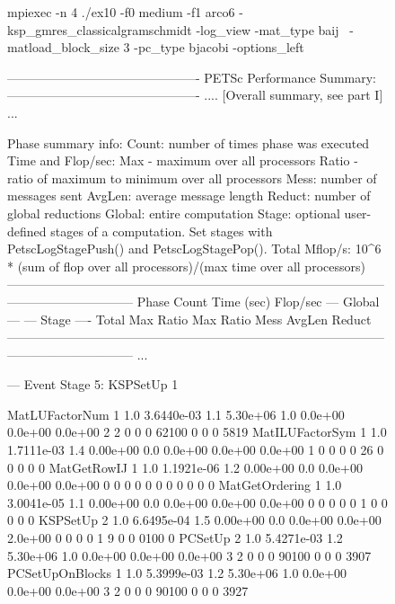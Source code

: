 \begin{figure}[tb]
  \begin{outputlisting}[\tiny\ttfamily]
mpiexec -n 4 ./ex10 -f0 medium -f1 arco6 -ksp_gmres_classicalgramschmidt -log_view -mat_type baij \
            -matload_block_size 3 -pc_type bjacobi -options_left

---------------------------------------------- PETSc Performance Summary: ----------------------------------------------
.... [Overall summary, see part I] ...

Phase summary info:
   Count: number of times phase was executed
   Time and Flop/sec: Max - maximum over all processors
                       Ratio - ratio of maximum to minimum over all processors
   Mess: number of messages sent
   AvgLen: average message length
   Reduct: number of global reductions
   Global: entire computation
   Stage: optional user-defined stages of a computation. Set stages with PetscLogStagePush() and PetscLogStagePop().
   Total Mflop/s: 10^6 * (sum of flop over all processors)/(max time over all processors)
------------------------------------------------------------------------------------------------------------------------
Phase              Count      Time (sec)       Flop/sec                          --- Global ---  --- Stage ----  Total
                            Max    Ratio      Max    Ratio  Mess AvgLen  Reduct  %
------------------------------------------------------------------------------------------------------------------------
...

--- Event Stage 5: KSPSetUp 1

MatLUFactorNum         1 1.0 3.6440e-03 1.1 5.30e+06 1.0 0.0e+00 0.0e+00 0.0e+00  2  2  0  0  0  62100  0  0  0  5819
MatILUFactorSym        1 1.0 1.7111e-03 1.4 0.00e+00 0.0 0.0e+00 0.0e+00 0.0e+00  1  0  0  0  0  26  0  0  0  0     0
MatGetRowIJ            1 1.0 1.1921e-06 1.2 0.00e+00 0.0 0.0e+00 0.0e+00 0.0e+00  0  0  0  0  0   0  0  0  0  0     0
MatGetOrdering         1 1.0 3.0041e-05 1.1 0.00e+00 0.0 0.0e+00 0.0e+00 0.0e+00  0  0  0  0  0   1  0  0  0  0     0
KSPSetUp               2 1.0 6.6495e-04 1.5 0.00e+00 0.0 0.0e+00 0.0e+00 2.0e+00  0  0  0  0  1   9  0  0  0100     0
PCSetUp                2 1.0 5.4271e-03 1.2 5.30e+06 1.0 0.0e+00 0.0e+00 0.0e+00  3  2  0  0  0  90100  0  0  0  3907
PCSetUpOnBlocks        1 1.0 5.3999e-03 1.2 5.30e+06 1.0 0.0e+00 0.0e+00 0.0e+00  3  2  0  0  0  90100  0  0  0  3927


\end{outputlisting}
\end{figure}
